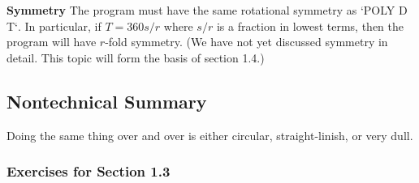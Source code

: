 \documentclass{book}
\begin{document}
\noindent \textbf{Symmetry} The program must have the same rotational symmetry as
\textsc{`POLY D T`}. In particular, if $T = 360s/r$ where $s/r$ is a fraction in lowest
terms, then the program will have $r$-fold symmetry. (We have not yet
discussed symmetry in detail. This topic will form the basis of section 1.4.)

\subsection{Nontechnical Summary}

Doing the same thing over and over is either circular, straight-linish, or
very dull.

\subsubsection{Exercises for Section 1.3}
\end{document}
